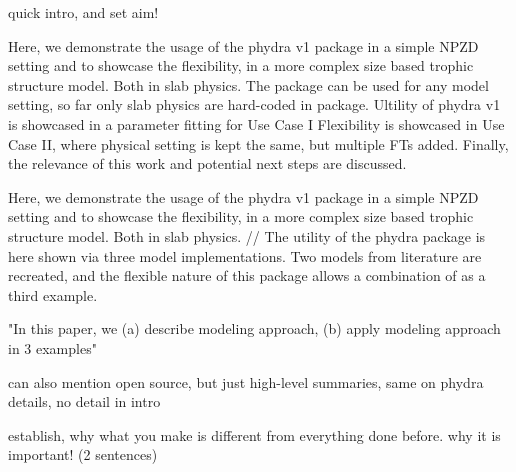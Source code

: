 \documentclass[journal abbreviation, manuscript]{copernicus}
\begin{document}
quick intro, and set aim!

Here, we demonstrate the usage of the phydra v1 package in a simple NPZD setting and to showcase the flexibility, in a more complex size based trophic structure model. Both in slab physics.
The package can be used for any model setting, so far only slab physics are hard-coded in package.
Ultility of phydra v1 is showcased in a parameter fitting for Use Case I
Flexibility is showcased in Use Case II, where physical setting is kept the same, but multiple FTs added.
Finally, the relevance of this work and potential next steps are discussed.

Here, we demonstrate the usage of the phydra v1 package in a simple NPZD setting and to showcase the flexibility, in a more complex size based trophic structure model. Both in slab physics.
//
The utility of the phydra package is here shown via three model implementations. Two models from literature are recreated, and the flexible nature of this package allows a combination of as a third example. 


"In this paper, we (a) describe modeling approach, (b) apply modeling approach in 3 examples"

can also mention open source, but just high-level summaries, same on phydra details, no detail in intro

establish, why what you make is different from everything done before. why it is important! (2 sentences)
\end{document}
